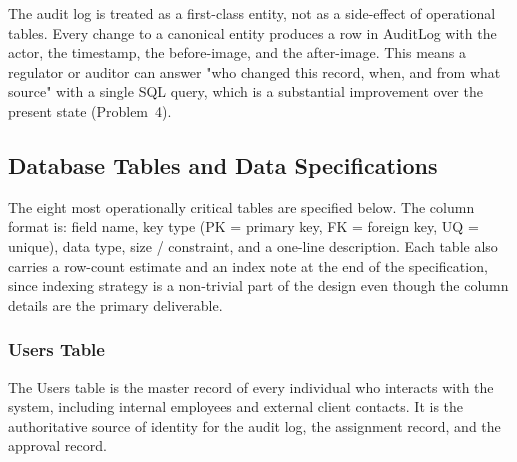 \documentclass[12pt,a4paper]{report}
\begin{document}
The audit log is treated as a first-class entity, not as a side-effect of
operational tables. Every change to a canonical entity produces a row in
AuditLog with the actor, the timestamp, the before-image, and the after-image.
This means a regulator or auditor can answer "who changed this record, when,
and from what source" with a single SQL query, which is a substantial
improvement over the present state (Problem~4).

\subsection{Database Tables and Data Specifications}
\label{sec:design-tables}

The eight most operationally critical tables are specified below. The column
format is: field name, key type (PK = primary key, FK = foreign key, UQ =
unique), data type, size / constraint, and a one-line description. Each table
also carries a row-count estimate and an index note at the end of the
specification, since indexing strategy is a non-trivial part of the design
even though the column details are the primary deliverable.

\subsubsection{Users Table}
\label{tab:users}

The Users table is the master record of every individual who interacts with the
system, including internal employees and external client contacts. It is the
authoritative source of identity for the audit log, the assignment record, and
the approval record.
\end{document}
